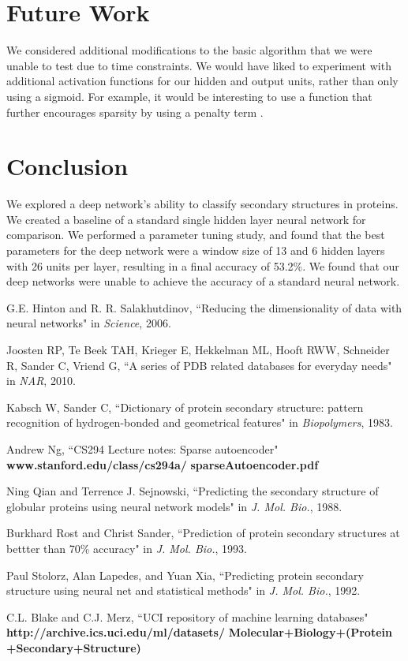\documentclass[letterpaper,twocolumn,12pt]{article}
\begin{document}
\section{Future Work}
We considered additional modifications to the basic algorithm that we were unable to test due to time constraints.
We would have liked to experiment with additional activation functions for our hidden and output units, rather than only using a sigmoid.
For example, it would be interesting to use a function that further encourages sparsity by using a penalty term \cite{Ng}.

\section{Conclusion}
We explored a deep network's ability to classify secondary structures in proteins.
We created a baseline of a standard single hidden layer neural network for comparison.
We performed a parameter tuning study, and found that the best parameters for the deep network were a window size of 13 and 6 hidden layers with 26 units per layer, resulting in a final accuracy of 53.2\%.
We found that our deep networks were unable to achieve the accuracy of a standard neural network.

\small{
\begin{thebibliography}{9}


G.E. Hinton and R. R. Salakhutdinov,
   ``Reducing the dimensionality of data with neural networks"
   in \emph{Science}, 2006.

Joosten RP, Te Beek TAH, Krieger E, Hekkelman ML, Hooft RWW, Schneider R, Sander C, Vriend G,
   ``A series of PDB related databases for everyday needs"
   in \emph{NAR}, 2010.

Kabsch W, Sander C,
   ``Dictionary of protein secondary structure: pattern recognition of hydrogen-bonded and geometrical features"
   in \emph{Biopolymers}, 1983.

Andrew Ng,
   ``CS294 Lecture notes: Sparse autoencoder"
   \textbf{www.stanford.edu/class/cs294a/}
   \textbf{sparseAutoencoder.pdf}

Ning Qian and Terrence J. Sejnowski,
  ``Predicting the secondary structure of globular proteins using neural network models"
  in \emph{J. Mol. Bio.}, 1988.

Burkhard Rost and Christ Sander,
  ``Prediction of protein secondary structures at bettter than 70\% accuracy"
  in \emph{J. Mol. Bio.}, 1993.

Paul Stolorz, Alan Lapedes, and Yuan Xia,
   ``Predicting protein secondary structure using neural net and statistical methods"
   in \emph{J. Mol. Bio.}, 1992.

   C.L. Blake and C.J. Merz,
   ``UCI repository of machine learning databases"
   \textbf{http://archive.ics.uci.edu/ml/datasets/}
   \textbf{Molecular+Biology+(Protein}
   \textbf{+Secondary+Structure)}

\end{thebibliography}
}
\end{document}
